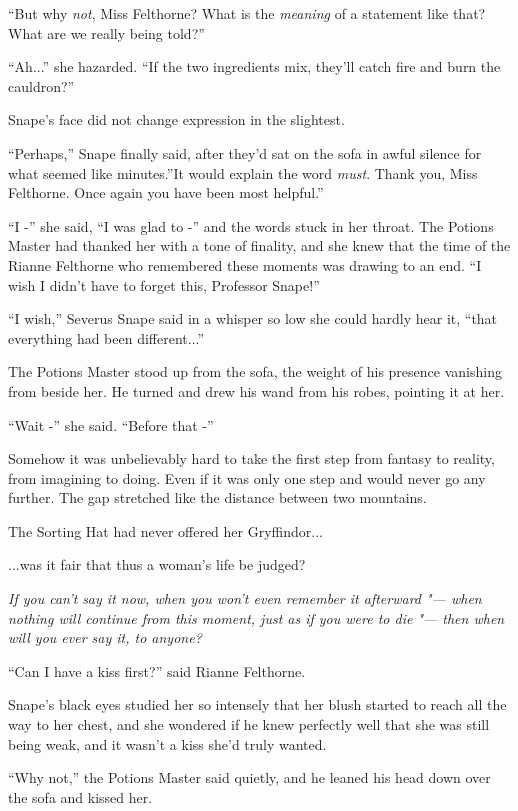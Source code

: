``But why \emph{not}, Miss Felthorne? What is the \emph{meaning} of a
statement like that? What are we really being told?''

``Ah...'' she hazarded. ``If the two ingredients mix, they'll catch
fire and burn the cauldron?''

Snape's face did not change expression in the slightest.

``Perhaps,'' Snape finally said, after they'd sat on the sofa in awful
silence for what seemed like minutes.''It would explain the word
\emph{must}. Thank you, Miss Felthorne. Once again you have been most
helpful.''

``I -'' she said, ``I was glad to -'' and the words stuck in her throat.
The Potions Master had thanked her with a tone of finality, and she knew
that the time of the Rianne Felthorne who remembered these moments was
drawing to an end. ``I wish I didn't have to forget this, Professor
Snape!''

``I wish,'' Severus Snape said in a whisper so low she could hardly hear
it, ``that everything had been different...''

The Potions Master stood up from the sofa, the weight of his presence
vanishing from beside her. He turned and drew his wand from his robes,
pointing it at her.

``Wait -'' she said. ``Before that -''

Somehow it was unbelievably hard to take the first step from fantasy to
reality, from imagining to doing. Even if it was only one step and would
never go any further. The gap stretched like the distance between two
mountains.

The Sorting Hat had never offered her Gryffindor...

...was it fair that thus a woman's life be judged?

\emph{If you can't} \emph{say it now, when you won't even remember it
afterward "--- when nothing will continue from this moment, just as if you
were to die "--- then when will you ever say it, to anyone?}

``Can I have a kiss first?'' said Rianne Felthorne.

Snape's black eyes studied her so intensely that her blush started to
reach all the way to her chest, and she wondered if he knew perfectly
well that she was still being weak, and it wasn't a kiss she'd truly
wanted.

``Why not,'' the Potions Master said quietly, and he leaned his head
down over the sofa and kissed her.

